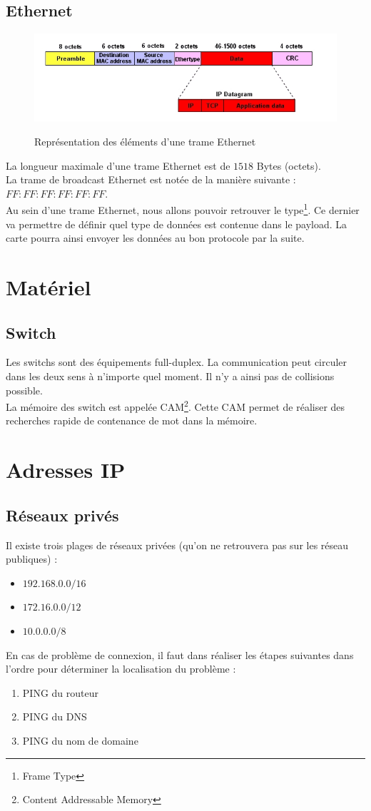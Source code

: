 \subsection{Ethernet}
\begin{figure}[H]
  \centering
  \includegraphics[width=.9\textwidth]{img/ethernetFrame.jpg}
  \label{img:3}
  \caption{Représentation des éléments d'une trame Ethernet}
\end{figure}
La longueur maximale d'une trame Ethernet est de $1518$ Bytes (octets).\\
La trame de broadcast Ethernet est notée de la manière suivante : $FF:FF:FF:FF:FF:FF$.\\
Au sein d'une trame Ethernet, nous allons pouvoir retrouver le type\footnote{Frame Type}. Ce dernier va permettre de définir quel type de données est contenue dans le payload. La carte pourra ainsi envoyer les données au bon protocole par la suite.

\section{Matériel}
\subsection{Switch}
Les switchs sont des équipements full-duplex. La communication peut circuler dans les deux sens à n'importe quel moment. Il n'y a ainsi pas de collisions possible.\\
La mémoire des switch est appelée CAM\footnote{Content Addressable Memory}. Cette CAM permet de réaliser des recherches rapide de contenance de mot dans la mémoire.

\section{Adresses IP}
\subsection{Réseaux privés}
Il existe trois plages de réseaux privées (qu'on ne retrouvera pas sur les réseau publiques) :
\begin{itemize}
 \item $192.168.0.0/16$
 \item $172.16.0.0/12$
 \item $10.0.0.0/8$
\end{itemize}
En cas de problème de connexion, il faut dans réaliser les étapes suivantes dans l'ordre pour déterminer la localisation du problème :
\begin{enumerate}
 \item PING du routeur
 \item PING du DNS
 \item PING du nom de domaine
\end{enumerate}
